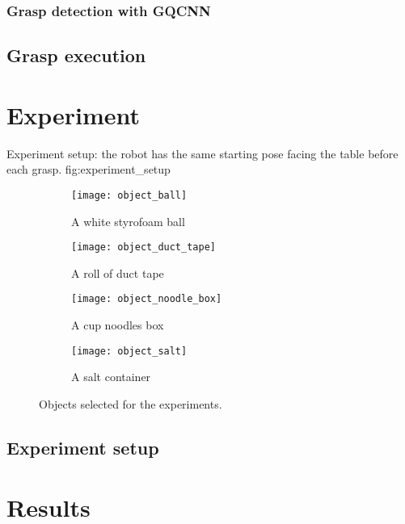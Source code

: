 \subsubsection*{Grasp detection with GQCNN}

\subsection{Grasp execution}

\pagebreak
\section{Experiment}


             {Experiment setup: the robot has the same starting pose facing the table before each grasp.}
             {fig:experiment_setup}{\textwidth}

\begin{figure}[htb]
    \centering
    \small
    \begin{subfigure}[b]{0.45\textwidth}
        \texttt{[image: object\_ball]}
        \caption{A white styrofoam ball}
        \label{fig:object_ball}
    \end{subfigure}
    \hfill
    \begin{subfigure}[b]{0.45\textwidth}
        \texttt{[image: object\_duct\_tape]}
        \caption{A roll of duct tape}
        \label{fig:object_duct_tape}
    \end{subfigure}

    \begin{subfigure}[b]{0.45\textwidth}
        \texttt{[image: object\_noodle\_box]}
        \caption{A cup noodles box}
        \label{fig:object_noodle_box}
    \end{subfigure}
    \hfill
    \begin{subfigure}[b]{0.45\textwidth}
    \texttt{[image: object\_salt]}
    \caption{A salt container}
    \label{fig:object_salt}
    \end{subfigure}
    \caption{Objects selected for the experiments.}\label{fig:objects}
\end{figure}

\subsection{Experiment setup}


\section{Results}

